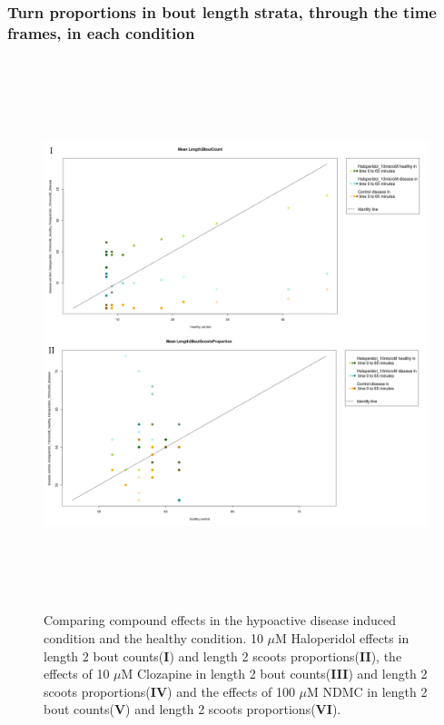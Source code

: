 \documentclass[a4paper,12pt]{article}
\begin{document}
\subsubsection{Turn proportions in bout length strata, through the time frames, in each condition}
\begin{figure}[h!]
\begin{center}
\caption{Comparing compound effects in the hypoactive disease induced condition and the healthy condition. 10 $\mu$M Haloperidol effects in length 2 bout counts(\textbf{I}) and length 2 scoots proportions(\textbf{II}), the effects of 10 $\mu$M Clozapine in length 2 bout counts(\textbf{III}) and length 2 scoots proportions(\textbf{IV}) and the effects of 100 $\mu$M NDMC in length 2 bout counts(\textbf{V}) and length 2 scoots proportions(\textbf{VI}).}
\includegraphics[width=15cm,height=16cm]{ApoLowCountScootsH.png}
\end{center}
\end{figure}
\newpage
\end{document}
